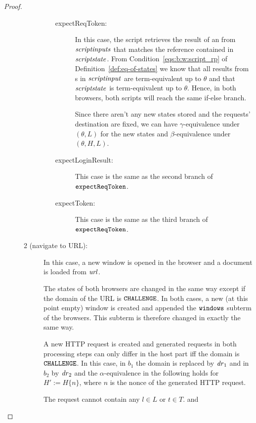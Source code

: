 \begin{proof}
\begin{description}
\begin{description}
\begin{enumerate}
\begin{description}
            \item[expectReqToken:] In this case, the script
              retrieves the result of an \xhr from 
              $\mathit{scriptinputs}$ that matches the reference 
              contained in $\mathit{scriptstate}$. From
              Condition~\ref{eqs:b:w:script_rp} of
              Definition~\ref{def:eq-of-states} we know that all 
              results from \xhr{}s in $\mathit{scriptinput}$ are 
              term-equivalent up to $\theta$ and that 
              $\mathit{scriptstate}$ is term-equivalent up to 
              $\theta$. Hence, in both browsers, both scripts 
              will reach the same if-else branch.
  
              Since there aren't any new states stored and the
              requests' destination are fixed, we can have 
              $\gamma$-equivalence under $(\theta,L)$ for the 
              new states and $\beta$-equivalence under 
              $(\theta,H,L)$. 
              \item[expectLoginResult:] This case is the same as 
                the second branch of $\mathtt{expectReqToken}$.
              \item[expectToken:] This case is the same as 
                the third branch of $\mathtt{expectReqToken}$.
            \end{description}
          \end{enumerate}
        \item[2 (navigate to URL):] 
        In this case, a new window is opened
        in the browser and a document is loaded from $\mathit{url}$.
  
        The states of both browsers are changed in the same way except
        if the domain of the URL is $\mathtt{CHALLENGE}$. In both cases, a
        new (at this point empty) window is created and appended the
        $\mathtt{windows}$ subterm of the browsers. This subterm is
        therefore changed in exactly the same way.
  
        A new HTTP request is created and generated requests in 
        both processing
        steps can only differ in the host part iff the domain is
        $\mathtt{CHALLENGE}$. In this case, in $b_1$ the domain is replaced
        by $\mathit{dr}_1$ and in $b_2$ by $\mathit{dr}_2$ and the
        $\alpha$-equivalence in the following holds for $H' := H \{n\}$,
        where $n$ is the nonce of the generated HTTP request.
  
        The request cannot contain any $l \in L$ or $t \in T$.
        and 
        

\end{description}
\end{description}
\end{proof}
